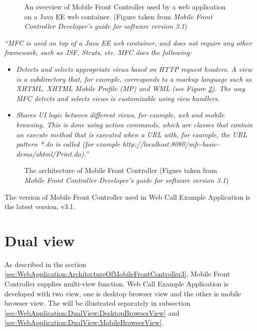 \begin{figure}[!hbtp]
\centering
{}
\caption{An overview of Mobile Front Controller used by a web application on a
Java EE web container. (Figure taken from \textit{Mobile Front Controller Developer's guide for software version 3.1}\cite{DevelopersGuideOfMFC})}
\label{fig:MFCOverview}
\end{figure} 

\textit{``MFC is used on top of a Java EE web container, and does not require any other framework, such as JSF, Struts, etc.
MFC does the following:}
\begin{itemize}
\item \textit{{Detects and selects appropriate views based on HTTP request headers. A view is a subdirectory that, for example, corresponds to a markup language such as XHTML, XHTML Mobile Profile (MP) and WML (see Figure \ref{fig:ArchitecureOfMFC}). The way MFC detects and selects views is customizable using view handlers.} }
\item \textit{Shares UI logic between different views, for example, web and mobile browsing. This is done using action commands, which are classes that contain an execute method that is executed when a URL with, for example, the URL pattern *.do is called (for example http://localhost:8080/mfc-basic-demo/xhtml/Print.do).''}\cite{DevelopersGuideOfMFC}
\end{itemize}

\begin{figure}[!hbtp]
\centering
{}
\caption{The architecture of Mobile Front Controller (Figure taken from \textit{Mobile Front Controller Developer's guide for software version 3.1}\cite{DevelopersGuideOfMFC})}
\label{fig:ArchitecureOfMFC}
\end{figure} 

The version of Mobile Front Controller used in Web Call Example Application is the latest version, v3.1.

\section{Dual view}
\label{sec:WebApplication:DualView}

As described in the section \ref{sec:WebApplication:ArchitectureOfMobileFrontController3}, Mobile Front Controller supplies multi-view function. Web Call Example Application is developed with two view, one is desktop browser view and the other is mobile browser view. The will be illustrated separately in subsection \ref{sec:WebApplication:DualView:DesktopBrowserView} and \ref{sec:WebApplication:DualView:MobileBrowserView}.

